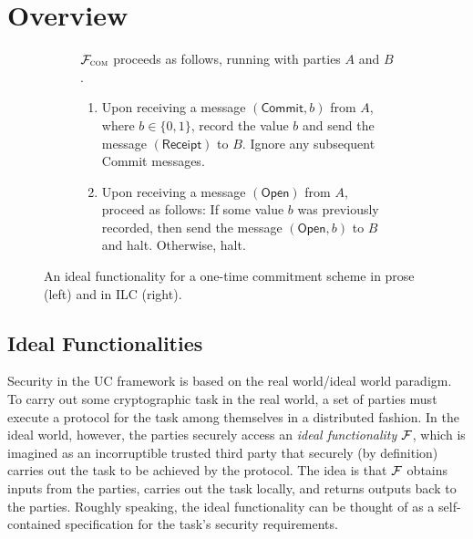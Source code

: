\section{Overview}
\label{sec:background}

\begin{figure}
\begin{subfigure}{.6\textwidth}
\begin{func}
    $\mathcal{{F}}_{\textsc{com}}$ proceeds as follows, running with parties $A$ and
  $B$.
    \begin{enumerate}
        \item Upon receiving a message $(\mathsf{Commit}, b)$ from $A$, where $b
          \in \{ 0, 1 \}$, record the value $b$ and send the message
          $(\mathsf{Receipt})$ to $B$. Ignore any subsequent \textsf{Commit}
          messages.
        \item Upon receiving a message $(\mathsf{Open})$ from $A$, proceed as
          follows: If some value $b$ was previously recorded, then send the
          message $(\mathsf{Open}, b)$ to $B$ and halt. Otherwise, halt.
    \end{enumerate}
\end{func}
\label{func:com}
\end{subfigure}\hspace{.04\textwidth}%
\begin{subfigure}{.35\textwidth}
  
\end{subfigure}
\caption{An ideal functionality for a one-time commitment scheme in prose (left)
  and in ILC (right).}
\label{func:com}
\end{figure}

\subsection{Ideal Functionalities}
\label{subsec:functionalities}

Security in the UC framework is based on the real world/ideal world paradigm. To
carry out some cryptographic task in the real world, a set of parties must
execute a protocol for the task among themselves in a distributed fashion. In
the ideal world, however, the parties securely access an \emph{ideal
  functionality} $\mathcal{{F}}$, which is imagined as an incorruptible trusted third
party that securely (by definition) carries out the task to be achieved by the
protocol. The idea is that $\mathcal{{F}}$ obtains inputs from the parties, carries out
the task locally, and returns outputs back to the parties. Roughly speaking, the
ideal functionality can be thought of as a self-contained specification for the
task's security requirements.

